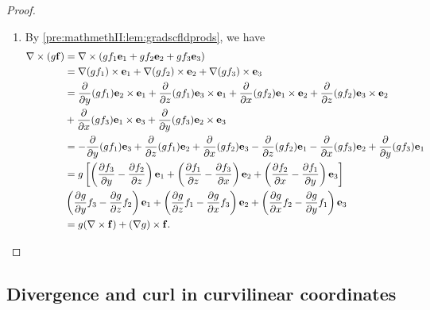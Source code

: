 \documentclass[10pt, a4paper]{article}
\begin{document}
\begin{proposition}
\begin{proof}
\begin{enumerate}[label = (\roman*)]
            \item By \autoref{pre:mathmethII:lem:gradscfldprods},
            we have
            \begin{align*}
                \bnabla \times (g\vec{f}) &= \bnabla \times (gf_1\vec{e}_1 + gf_2\vec{e}_2 + gf_3\vec{e}_3) \\
                &= \bnabla(gf_1) \times \vec{e}_1 + \bnabla (gf_2) \times \vec{e}_2 + \bnabla(gf_3)\times \vec{e}_3 \\
                &= \pd{y}(gf_1)\vec{e}_2 \times \vec{e}_1 + \pd{z}(gf_1)\vec{e}_3 \times \vec{e}_1 + \pd{x}(gf_2)\vec{e}_1 \times \vec{e}_2 + \pd{z}(gf_2)\vec{e}_3 \times \vec{e}_2 \\
                &+ \pd{x}(gf_3)\vec{e}_1 \times \vec{e}_3 + \pd{y}(gf_3)\vec{e}_2 \times \vec{e}_3 \\
                &= -\pd{y}(gf_1)\vec{e}_3 + \pd{z}(gf_1)\vec{e}_2 + \pd{x}(gf_2)\vec{e}_3 - \pd{z}(gf_2)\vec{e}_1 - \pd{x}(gf_3)\vec{e}_2 + \pd{y}(gf_3)\vec{e}_1 \\
                &= g\left[\left(\pd[f_3]{y} - \pd[f_2]{z}\right)\vec{e}_1 + \left(\pd[f_1]{z} - \pd[f_3]{x}\right)\vec{e}_2 + \left(\pd[f_2]{x} - \pd[f_1]{y}\right)\vec{e}_3\right] \\
                &\left(\pd[g]{y}f_3 - \pd[g]{z}f_2\right)\vec{e}_1 + \left(\pd[g]{z}f_1 - \pd[g]{x}f_3\right)\vec{e}_2 + \left(\pd[g]{x}f_2 - \pd[g]{y}f_1\right)\vec{e}_3 \\
                &= g(\bnabla \times \vec{f}) + (\bnabla g) \times \vec{f}.
            \end{align*}
        \end{enumerate}
    \end{proof}
\end{proposition}

\subsection{Divergence and curl in curvilinear coordinates}
\end{document}
